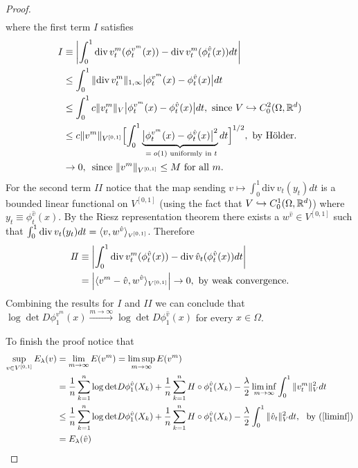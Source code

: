 \documentclass[noinfoline]{imsart}
\begin{document}
\begin{proof}
\begin{align*}
\end{align*}
where the first term $I$ satisfies
\begin{align*}
I &\equiv \left| \int_{0}^1 \text{div}\, v^m_t(\phi_t^{v^m}(x)) -  \text{div}\, v^m_t(\phi_t^{\hat v}(x)) dt \right| \\
&\leq \int_{0}^1 \|\text{div}\, v^m_t\|_{1,\infty} \bigl|\phi_t^{v^m}(x) -  \phi_t^{\hat v}(x)\bigr| dt  \\
&\leq   \int_{0}^1 c\| v^m_t\|_{V} \bigl|\phi_t^{v^m}(x) -  \phi_t^{\hat v}(x)\bigr| dt,\,\,\text{since $V\hookrightarrow C_0^2(\Omega,\Bbb R^d)$} \\
&\leq  c\|  v^m\|_{V^{[0,1]}} \Bigl[\int_{0}^1 \underbrace{\bigl|\phi_t^{v^m}(x) -  \phi_t^{\hat v}(x)\bigr|^2}_\text{ $= o(1)$ uniformly in $t$} dt\Bigr]^{1/2},\,\,\text{by H\"older.} \\
&\rightarrow 0,\,\text{ since $\| v^m\|_{V^{[0,1]}}\leq M$ for all $m$.}
\end{align*}
For the second term $I\!I$ notice that  the map sending $v\mapsto \int_0^1 \text{div}\, v_t(y_t) dt$ is a bounded linear functional on $V^{[0,1]}$ (using the fact that $V\hookrightarrow C_0^1(\Omega, \Bbb R^d)$) where $y_t \equiv \phi_t^{\hat v}(x)$. By the Riesz representation theorem there exists a $w^{\hat v}\in V^{[0,1]}$ such that $\int_0^1 \text{div}\, v_t(y_t) dt = \langle v,w^{\hat v} \rangle_\text{\tiny $V^{[0,1]}$}$. Therefore  %
 \begin{align*}
I\!I
&\equiv \left| \int_{0}^1 \text{div}\, v_t^m(\phi_t^{\hat v}(x)) -  \text{div}\, \hat v_t(\phi_t^{\hat v}(x)) dt \right|\\
&=   \Bigl| \langle v^m -  \hat v, w^{\hat v}\rangle_{V^{[0,1]}}\Bigr|\rightarrow 0, \,\,\text{by weak convergence.}
\end{align*}
Combining the results for $I$ and $I\!I$ we can conclude that $\log \det D\phi_1^{v^m}(x)\overset{m\rightarrow\infty}\longrightarrow \log \det D\phi_1^{\hat v}(x)$ for every $x\in \Omega$.

To finish the proof notice that
\begin{align}
\sup_{v\in V^{[0,1]}} E_\lambda(v) &= \lim_{m\rightarrow \infty} E(v^m)= \limsup_{m\rightarrow \infty} E(v^m)\nonumber\\
&= \frac{1}{n}\sum_{k=1}^n   \log\text{det} D\phi_1^{\hat v}(X_k)+ \frac{1}{n}\sum_{k=1}^n H\circ\phi_1^{\hat v}(X_k) -\frac{\lambda}{2} \liminf_{m\rightarrow \infty} \int_0^1 \| v^m_t \|_V^2 dt \nonumber\\
&\leq \frac{1}{n}\sum_{k=1}^n   \log\text{det} D\phi_1^{\hat v}(X_k)+ \frac{1}{n}\sum_{k=1}^n H\circ\phi_1^{\hat v}(X_k) -\frac{\lambda}{2}  \int_0^1 \| \hat v_t \|_V^2 dt,\,\,\text{ by (\ref{liminf})}\nonumber \\
&= E_\lambda(\hat v) \nonumber
\end{align}

  \end{proof}
\end{document}
